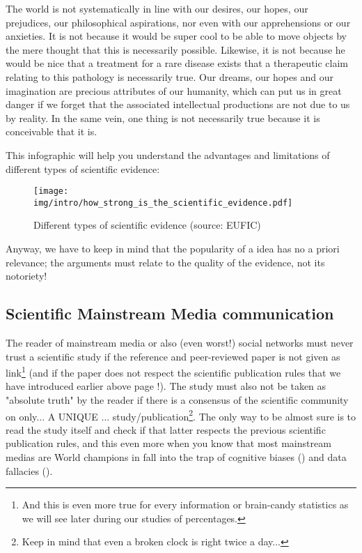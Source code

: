 	\begin{tcolorbox}[title=Remark,arc=10pt,breakable,drop lifted shadow,
  skin=enhanced,
  skin first is subskin of={enhancedfirst}{arc=10pt,no shadow},
  skin middle is subskin of={enhancedmiddle}{arc=10pt,no shadow},
  skin last is subskin of={enhancedlast}{drop lifted shadow}]
	The world is not systematically in line with our desires, our hopes, our prejudices, our philosophical aspirations, nor even with our apprehensions or our anxieties. It is not because it would be super cool to be able to move objects by the mere thought that this is necessarily possible. Likewise, it is not because he would be nice that a treatment for a rare disease exists that a therapeutic claim relating to this pathology is necessarily true. Our dreams, our hopes and our imagination are precious attributes of our humanity, which can put us in great danger if we forget that the associated intellectual productions are not due to us by reality. In the same vein, one thing is not necessarily true because it is conceivable that it is.
	\end{tcolorbox}
	
	This infographic will help you understand the advantages and limitations of different types of scientific evidence:
	\begin{figure}[H]
		\centering
		\texttt{[image: img/intro/how\_strong\_is\_the\_scientific\_evidence.pdf]}
		\caption[Different types of scientific evidence]{Different types of scientific evidence (source: EUFIC)}
	\end{figure}
	Anyway, we have to keep in mind that the popularity of a idea has no a priori relevance; the arguments must relate to the quality of the evidence, not its notoriety!
	

	\pagebreak
	\subsection{Scientific Mainstream Media communication}\label{scientific mainstream media communication}
	The reader of mainstream media or also (even worst!) social networks must never trust a scientific study if the reference and peer-reviewed paper is not given as link\footnote{And this is even more true for every information or brain-candy statistics as we will see later during our studies of percentages.} (and if the paper does not respect the scientific publication rules that we have introduced earlier above page \pageref{scientific publicatons rules}!). The study must also not be taken as "absolute truth" by the reader if there is a consensus of the scientific community on only... A UNIQUE ... study/publication\footnote{Keep in mind that even a broken clock is right twice a day...}. The only way to be almost sure is to read the study itself and check if that latter respects the previous scientific publication rules, and this even more when you know that most mainstream medias are World champions in fall into the trap of cognitive biases () and data fallacies ().
	
